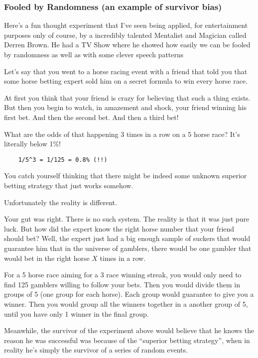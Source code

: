 \documentclass{article}
\begin{document}
\subsubsection{Fooled by Randomness (an example of survivor bias)}

Here's a fun thought experiment that I've seen being applied, for entertainment purposes only of course, by a incredibly talented Mentalist and Magician called Derren Brown. He had a TV Show where he showed how easily we can be fooled by randomness as well as with some clever speech patterns

Let's say that you went to a horse racing event with a friend that told you that some horse betting expert sold him on a secret formula to win every horse race. 

At first you think that your friend is crazy for believing that such a thing exists.
But then you begin to watch, in amazement and shock, your friend winning his first bet. And then the second bet. And then a third bet! 

What are the odds of that happening 3 times in a row on a 5 horse race? It's literally below 1\%!

\begin{lstlisting}
	1/5^3 = 1/125 = 0.8% (!!)
\end{lstlisting}

You catch yourself thinking that there might be indeed some unknown superior betting strategy that just works somehow.

Unfortunately the reality is different.

Your gut was right. There is no such system. The reality is that it was just pure luck. 
But how did the expert know the right horse number that your friend should bet? 
Well, the expert just had a big enough sample of suckers that would guarantee him that in the universe of gamblers, there would be one gambler that would bet in the right horse $X$ times in a row. 

For a 5 horse race aiming for a 3 race winning streak, you would only need to find 125 gamblers willing to follow your bets. Then you would divide them in groups of 5 (one group for each horse). Each group would guarantee to give you a winner. Then you would group all the winners together in a another group of 5, until you have only 1 winner in the final group.

Meanwhile, the survivor of the experiment above would believe that he knows the reason he was successful was because of the ``superior betting strategy'', when in reality he's simply the survivor of a series of random events.
\end{document}
